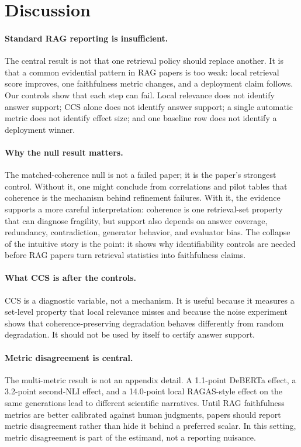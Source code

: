 \section{Discussion}

\paragraph{Standard RAG reporting is insufficient.}
The central result is not that one retrieval policy should replace another.
It is that a common evidential pattern in RAG papers is too weak: local
retrieval score improves, one faithfulness metric changes, and a deployment
claim follows. Our controls show that each step can fail. Local relevance does
not identify answer support; CCS alone does not identify answer support; a
single automatic metric does not identify effect size; and one baseline row
does not identify a deployment winner.

\paragraph{Why the null result matters.}
The matched-coherence null is not a failed paper; it is the paper's strongest
control. Without it, one might conclude from correlations and pilot tables that
coherence is the mechanism behind refinement failures. With it, the evidence
supports a more careful interpretation: coherence is one retrieval-set property
that can diagnose fragility, but support also depends on answer coverage,
redundancy, contradiction, generator behavior, and evaluator bias. The collapse
of the intuitive story is the point: it shows why identifiability controls are
needed before RAG papers turn retrieval statistics into faithfulness claims.

\paragraph{What CCS is after the controls.}
CCS is a diagnostic variable, not a mechanism. It is useful because it measures
a set-level property that local relevance misses and because the noise
experiment shows that coherence-preserving degradation behaves differently
from random degradation. It should not be used by itself to certify answer
support.

\paragraph{Metric disagreement is central.}
The multi-metric result is not an appendix detail. A 1.1-point DeBERTa effect,
a 3.2-point second-NLI effect, and a 14.0-point local RAGAS-style effect on
the same generations lead to different scientific narratives. Until RAG
faithfulness metrics are better calibrated against human judgments, papers
should report metric disagreement rather than hide it behind a preferred
scalar. In this setting, metric disagreement is part of the estimand, not a
reporting nuisance.

